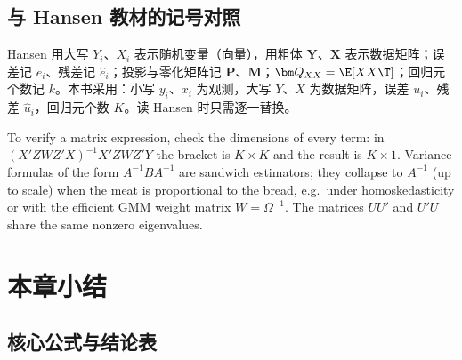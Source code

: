 \subsection{与 Hansen 教材的记号对照}

Hansen 用大写 $Y_i$、$X_i$ 表示随机变量（向量），用粗体 $\bm Y$、$\bm X$ 表示数据矩阵；误差记 $e_i$、残差记 $\hat e_i$；投影与零化矩阵记 $\bm P$、$\bm M$；$\bm Q_{XX}=\E[XX\T]$；回归元个数记 $k$。本书采用：小写 $y_i$、$x_i$ 为观测，大写 $Y$、$X$ 为数据矩阵，误差 $u_i$、残差 $\hat u_i$，回归元个数 $K$。读 Hansen 时只需逐一替换。

\begin{english}
To verify a matrix expression, check the dimensions of every term: in $(X'ZWZ'X)^{-1}X'ZWZ'Y$ the bracket is $K\times K$ and the result is $K\times1$. Variance formulas of the form $A^{-1}BA^{-1}$ are sandwich estimators; they collapse to $A^{-1}$ (up to scale) when the meat is proportional to the bread, e.g.\ under homoskedasticity or with the efficient GMM weight matrix $W=\Omega^{-1}$. The matrices $UU'$ and $U'U$ share the same nonzero eigenvalues.
\end{english}

\section{本章小结}\label{sec:U01b-summary}

\subsection{核心公式与结论表}

